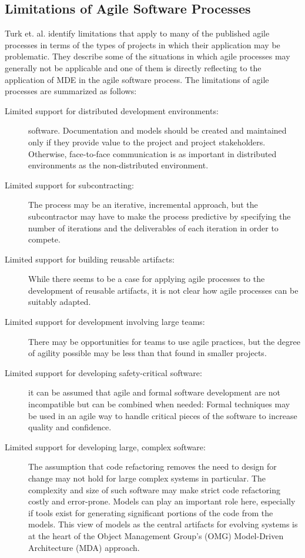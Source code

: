 \documentclass[10pt, a4paper, twocolumn]{article}
\begin{document}
\subsection{Limitations of Agile Software Processes}

Turk et. al. \cite{TurkFR14} identify limitations that apply to many of the published agile processes in terms of the types of projects in which their application may be problematic. They describe some of the situations in which agile processes may generally not be applicable and one of them is directly reflecting to the application of MDE in the agile software process. The limitations of agile processes are summarized as follows:

\begin{description}
\item[Limited support for distributed development environments:] software. Documentation and models should be created and maintained only if they provide value to the project and project stakeholders. Otherwise, face-to-face communication is as important in distributed environments as the non-distributed environment.
\item[Limited support for subcontracting:] The process may be an iterative, incremental approach, but the subcontractor may have to make the process predictive by specifying the number of iterations and the deliverables of each iteration in order to compete.
\item[Limited support for building reusable artifacts:] While there seems to be a case for applying agile processes to the development of reusable artifacts, it is not clear how agile processes can be suitably adapted.
\item[Limited support for development involving large teams:] There may be opportunities for teams to use agile practices, but the degree of agility possible may be less than that found in smaller projects.
\item[Limited support for developing safety-critical software:] it can be assumed that agile and formal software development are not incompatible but can be combined when needed: Formal techniques may be used in an agile way to handle critical pieces of the software to increase quality and confidence.
\item[Limited support for developing large, complex software:] The assumption that code refactoring removes the need to design for change may not hold for large complex systems in particular. The complexity and size of such software may make strict code refactoring costly and error-prone. Models can play an important role here, especially if tools exist for generating significant portions of the code from the models. This view of models as the central artifacts for evolving systems is at the heart of the Object Management Group’s (OMG) Model-Driven Architecture (MDA) approach.
\end{description}
\end{document}
